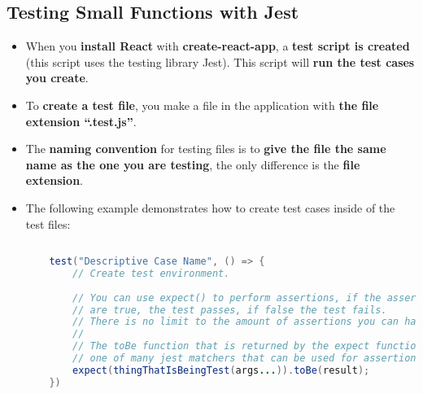 \documentclass{article}
\begin{document}
    \subsection*{Testing Small Functions with Jest}
    \begin{itemize}
        \item When you \textbf{install React} with \textbf{create-react-app}, a \textbf{test script is created} (this script uses the testing library Jest). This script will \textbf{run the test cases you create}.
        \item To \textbf{create a test file}, you make a file in the application with \textbf{the file extension ``.test.js''}.
        \item The \textbf{naming convention} for testing files is to \textbf{give the file the same name as the one you are testing}, the only difference is the \textbf{file extension}.
        \item The following example demonstrates how to create test cases inside of the test files:
        \begin{lstlisting}[language=Java]
            
    test("Descriptive Case Name", () => {
        // Create test environment.
        
        // You can use expect() to perform assertions, if the assertions 
        // are true, the test passes, if false the test fails.
        // There is no limit to the amount of assertions you can have.
        //
        // The toBe function that is returned by the expect function is
        // one of many jest matchers that can be used for assertions.
        expect(thingThatIsBeingTest(args...)).toBe(result);
    })
        \end{lstlisting}
    \end{itemize}
\end{document}
